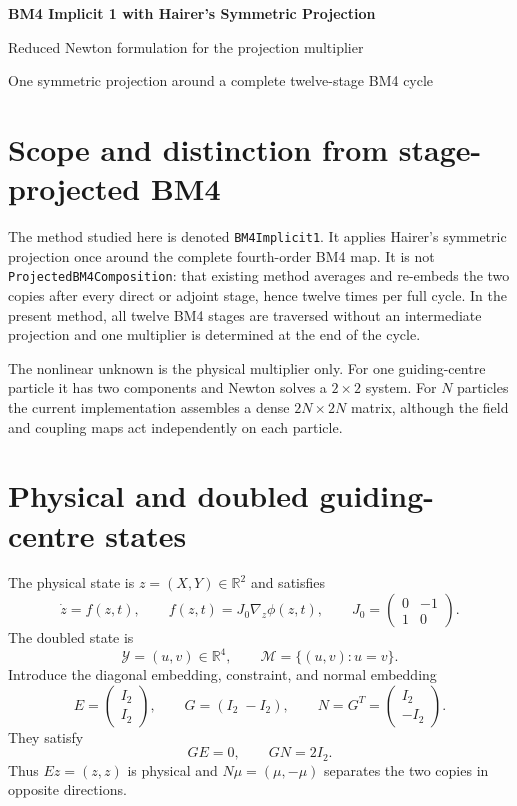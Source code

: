 \documentclass[11pt,a4paper]{article}
\newcommand{\R}{\mathbb{R}}
\newcommand{\Id}{I}
\newcommand{\Y}{\mathcal{Y}}
\newcommand{\M}{\mathcal{M}}
\begin{document}
\begin{center}
  {\LARGE\bfseries\color{blue}BM4 Implicit 1 with Hairer's Symmetric Projection}\par
  \vspace{0.35em}
  {\large Reduced Newton formulation for the projection multiplier}\par
  \vspace{0.45em}
  {\small One symmetric projection around a complete twelve-stage BM4 cycle}
\end{center}

\vspace{0.5em}

\section{Scope and distinction from stage-projected BM4}

The method studied here is denoted \texttt{BM4Implicit1}.  It applies Hairer's
symmetric projection once around the complete fourth-order BM4 map.  It is not
\texttt{ProjectedBM4Composition}: that existing method averages and re-embeds
the two copies after every direct or adjoint stage, hence twelve times per full
cycle.  In the present method, all twelve BM4 stages are traversed without an
intermediate projection and one multiplier is determined at the end of the
cycle.

The nonlinear unknown is the physical multiplier only.  For one guiding-centre
particle it has two components and Newton solves a $2\times2$ system.  For $N$
particles the current implementation assembles a dense $2N\times2N$ matrix,
although the field and coupling maps act independently on each particle.

\section{Physical and doubled guiding-centre states}

The physical state is $z=(X,Y)\in\R^2$ and satisfies
\[
 \dot z=f(z,t),
 \qquad
 f(z,t)=J_0\nabla_z\phi(z,t),
 \qquad
 J_0=
 \begin{pmatrix}0&-1\\1&0\end{pmatrix}.
\]
The doubled state is
\[
 \Y=(u,v)\in\R^4,
 \qquad
 \M=\{(u,v):u=v\}.
\]
Introduce the diagonal embedding, constraint, and normal embedding
\[
 E=\begin{pmatrix}\Id_2\\\Id_2\end{pmatrix},
 \qquad
 G=(\Id_2\;-\Id_2),
 \qquad
 N=G^T=\begin{pmatrix}\Id_2\\-\Id_2\end{pmatrix}.
\]
They satisfy
\[
 GE=0,
 \qquad
 GN=2\Id_2.
\]
Thus $Ez=(z,z)$ is physical and $N\mu=(\mu,-\mu)$ separates the two
copies in opposite directions.
\end{document}
